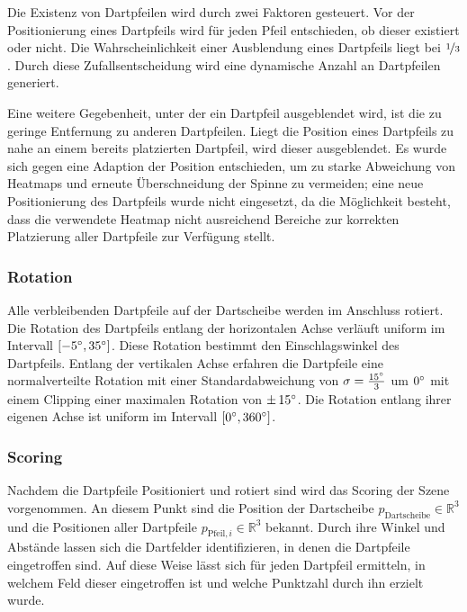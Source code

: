 Die Existenz von Dartpfeilen wird durch zwei Faktoren gesteuert. Vor der Positionierung eines Dartpfeils wird für jeden Pfeil entschieden, ob dieser existiert oder nicht. Die Wahrscheinlichkeit einer Ausblendung eines Dartpfeils liegt bei $\nicefrac{1}{3}$. Durch diese Zufallsentscheidung wird eine dynamische Anzahl an Dartpfeilen generiert.

Eine weitere Gegebenheit, unter der ein Dartpfeil ausgeblendet wird, ist die zu geringe Entfernung zu anderen Dartpfeilen. Liegt die Position eines Dartpfeils zu nahe an einem bereits platzierten Dartpfeil, wird dieser ausgeblendet. Es wurde sich gegen eine Adaption der Position entschieden, um zu starke Abweichung von Heatmaps und erneute Überschneidung der Spinne zu vermeiden; eine neue Positionierung des Dartpfeils wurde nicht eingesetzt, da die Möglichkeit besteht, dass die verwendete Heatmap nicht ausreichend Bereiche zur korrekten Platzierung aller Dartpfeile zur Verfügung stellt.

\subsubsection{Rotation}

Alle verbleibenden Dartpfeile auf der Dartscheibe werden im Anschluss rotiert. Die Rotation des Dartpfeils entlang der horizontalen Achse verläuft uniform im Intervall $[-5^{\circ}, 35^{\circ}]$. Diese Rotation bestimmt den Einschlagswinkel des Dartpfeils. Entlang der vertikalen Achse erfahren die Dartpfeile eine normalverteilte Rotation mit einer Standardabweichung von $\sigma = \frac{15^{\circ}}{3}$ um $0^{\circ}$ mit einem Clipping einer maximalen Rotation von $\pm\,15^{\circ}$. Die Rotation entlang ihrer eigenen Achse ist uniform im Intervall $[0^{\circ}, 360^{\circ}]$.

\subsubsection{Scoring}

Nachdem die Dartpfeile Positioniert und rotiert sind wird das Scoring der Szene vorgenommen. An diesem Punkt sind die Position der Dartscheibe $p_\text{Dartscheibe} \in \mathbb{R}^3$ und die Positionen aller Dartpfeile $p_{\text{Pfeil}, i} \in \mathbb{R}^3$ bekannt. Durch ihre Winkel und Abstände lassen sich die Dartfelder identifizieren, in denen die Dartpfeile eingetroffen sind. Auf diese Weise lässt sich für jeden Dartpfeil ermitteln, in welchem Feld dieser eingetroffen ist und welche Punktzahl durch ihn erzielt wurde.

